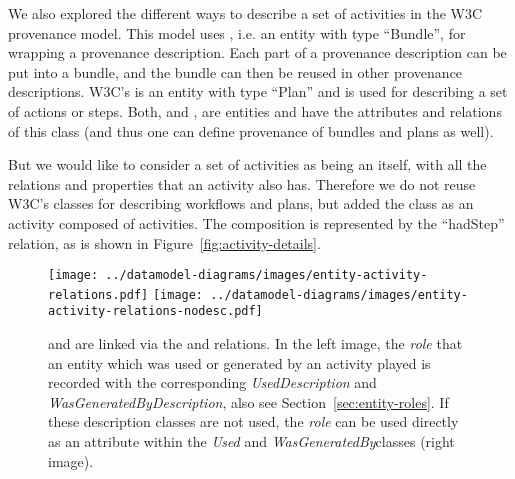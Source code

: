 We also explored the different ways to describe a set of activities in the W3C 
provenance model. This model uses , i.e. an entity with type ``Bundle'', 
for wrapping a provenance description. Each part of a provenance description can be 
put into a bundle, and the bundle can then be reused in other provenance descriptions. 
W3C's  is an entity with type ``Plan'' and is used for describing a 
set of actions or steps. Both,  and , are entities and 
have the attributes and relations of this class (and thus one can define provenance of bundles and plans as well).

But we would like to consider a set of activities as being an  itself, 
with all the relations and properties that an activity also has. Therefore we do not reuse
W3C's classes for describing workflows and plans, but added 
the class  as an activity composed of activities. The composition is represented by 
the ``hadStep'' relation, as is shown in Figure~\ref{fig:activity-details}.

%




\begin{figure}[h]
\centering
\texttt{[image: ../datamodel-diagrams/images/entity-activity-relations.pdf]}
\hspace{0.15\textwidth}
\texttt{[image: ../datamodel-diagrams/images/entity-activity-relations-nodesc.pdf]}
\caption{ and  are linked via the  and  relations. In the left image, the \emph{role} that an entity which was used or generated by an activity played is recorded with the corresponding \emph{UsedDescription} and \emph{WasGeneratedByDescription}, also see Section~\ref{sec:entity-roles}. If these description classes are not used, the \emph{role} can be used directly as an attribute within the \emph{Used} and \emph{WasGeneratedBy}classes (right image).}
\label{fig:entity-activity-relations}
\end{figure}


